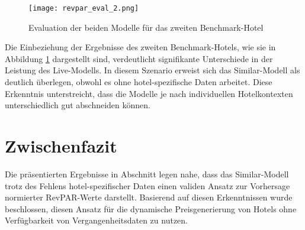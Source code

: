 \begin{figure}[h]
    \centering
    \texttt{[image: revpar\_eval\_2.png]}
    \caption[Evaluation der beiden Modelle für das zweiten Benchmark-Hotel]{Evaluation der beiden Modelle für das zweiten Benchmark-Hotel}
    \label{img:revpar_eval_2}
\end{figure}

Die Einbeziehung der Ergebnisse des zweiten Benchmark-Hotels, wie sie in Abbildung \ref{img:revpar_eval_2} dargestellt sind, verdeutlicht signifikante Unterschiede in der Leistung des Live-Modells. In diesem Szenario erweist sich das Similar-Modell als deutlich überlegen, obwohl es ohne hotel-spezifische Daten arbeitet. Diese Erkenntnis unterstreicht, dass die Modelle je nach individuellen Hotelkontexten unterschiedlich gut abschneiden können.

\section{Zwischenfazit}
\label{subsec:revpar_fazit}
Die präsentierten Ergebnisse in Abschnitt \emph{} legen nahe, dass das Similar-Modell trotz des Fehlens hotel-spezifischer Daten einen validen Ansatz zur Vorhersage normierter RevPAR-Werte darstellt. Basierend auf diesen Erkenntnissen wurde beschlossen, diesen Ansatz für die dynamische Preisgenerierung von Hotels ohne Verfügbarkeit von Vergangenheitsdaten zu nutzen.

